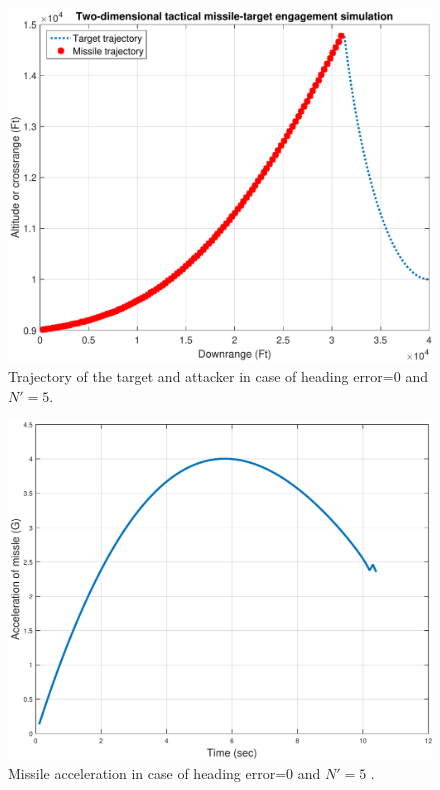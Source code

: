 \begin{figure}[htb]
	\centering
	\includegraphics[scale = 0.75]{fig/trajectory0NN5.pdf}
	\caption{Trajectory of the target and attacker in case of heading error=0 and $N'=5$.}
	\label{trajectory0NN5}
\end{figure}


\begin{figure}[htb]
	\centering
	\includegraphics[scale = 0.75]{fig/MissileAcceleration0NN5.pdf}
	\caption{Missile acceleration in case of heading error=0 and $N'=5$ .}
	\label{missile acceleration0NN5}
\end{figure}

